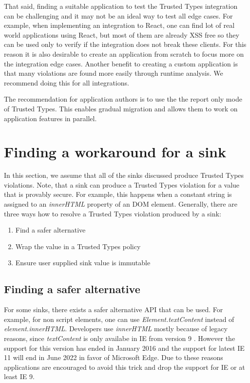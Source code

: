 That said, finding a suitable application to test the Trusted Types integration can be challenging
and it may not be an ideal way to test all edge cases. For example, when implementing an integration
to React, one can find lot of real world applications using React, but most of them are already XSS
free so they can be used only to verify if the integration does not break these clients. For this
reason it is also desirable to create an application from scratch to focus more on the integration
edge cases. Another benefit to creating a custom application is that many violations are found more
easily through runtime analysis. We recommend doing this for all integrations.

The recommendation for application authors is to use the the report only mode of Trusted Types. This
enables gradual migration and allows them to work on application features in parallel.

\section{Finding a workaround for a sink}

In this section, we assume that all of the sinks discussed produce Trusted Types violations. Note,
that a sink can produce a Trusted Types violation for a value that is provably secure. For example,
this happens when a constant string is assigned to an \emph{innerHTML} property of an DOM element.
Generally, there are three ways how to resolve a Trusted Types violation produced by a sink:

\begin{enumerate}
  \item Find a safer alternative
  \item Wrap the value in a Trusted Types policy
  \item Ensure user supplied sink value is immutable
\end{enumerate}

\subsection{Finding a safer alternative}

For some sinks, there exists a safer alternative API that can be used. For example, for non script
elements, one can use \emph{Element.textContent} instead of \emph{element.innerHTML}. Developers use
\emph{innerHTML} mostly because of legacy reasons, since \emph{textContent} is only availabe in IE
from version 9 \cite{text_content_mdn}. However the support for this version has ended in January
2016 and the support for latest IE 11 will end in June 2022 in favor of Microsoft Edge. Due to these
reasons applications are encouraged to avoid this trick and drop the support for IE or at least IE
9.

